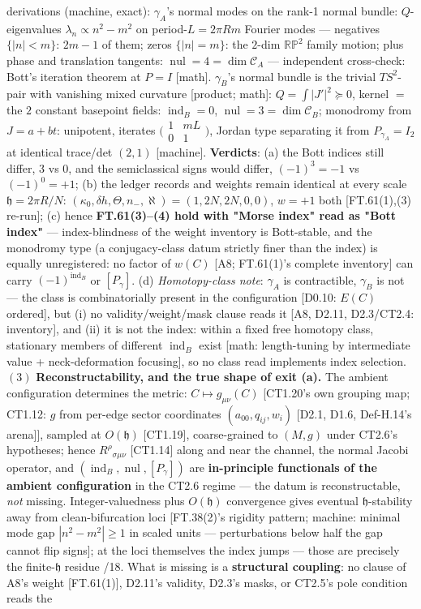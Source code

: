 \begin{theorem}
derivations (machine, exact): $\gamma_A$'s normal modes on the rank-1 normal bundle: $Q$-eigenvalues $\lambda_n\propto n^2-m^2$ on period-$L=2\pi Rm$ Fourier modes — negatives $\{|n|<m\}$: $2m-1$ of them; zeros $\{|n|=m\}$: the $2$-dim $\mathbb{RP}^2$ family motion; plus phase and translation tangents: $\operatorname{nul}=4=\dim\mathcal C_A$ — independent cross-check: Bott's iteration theorem at $P=I$ [math]. $\gamma_B$'s normal bundle is the trivial $TS^2$-pair with vanishing mixed curvature [product; math]: $Q=\int|J'|^2\succeq0$, kernel $=$ the $2$ constant basepoint fields: $\operatorname{ind}_B=0$, $\operatorname{nul}=3=\dim\mathcal C_B$; monodromy from $J=a+bt$: unipotent, iterates $\bigl(\begin{smallmatrix}1&mL\\0&1\end{smallmatrix}\bigr)$, Jordan type separating it from $P_{\gamma_A}=I_2$ at identical trace/det $(2,1)$ [machine]. \textbf{Verdicts}: (a) the Bott indices still differ, $3$ vs $0$, and the semiclassical signs would differ, $(-1)^3=-1$ vs $(-1)^0=+1$; (b) the ledger records and weights remain identical at every scale $\mathfrak h=2\pi R/N$: $(\kappa_0,\delta h,\Theta,n_-,\aleph)=(1,2N,2N,0,0)$, $w=+1$ both [FT.61(1),(3) re-run]; (c) hence \textbf{FT.61(3)–(4) hold with "Morse index" read as "Bott index"} — index-blindness of the weight inventory is Bott-stable, and the monodromy type (a conjugacy-class datum strictly finer than the index) is equally unregistered: no factor of $w(C)$ [A8; FT.61(1)'s complete inventory] can carry $(-1)^{\operatorname{ind}_B}$ or $[P_\gamma]$. (d) \textit{Homotopy-class note}: $\gamma_A$ is contractible, $\gamma_B$ is not — the class is combinatorially present in the configuration [D0.10: $E(C)$ ordered], but (i) no validity/weight/mask clause reads it [A8, D2.11, D2.3/CT2.4: inventory], and (ii) it is not the index: within a fixed free homotopy class, stationary members of different $\operatorname{ind}_B$ exist [math: length-tuning by intermediate value + neck-deformation focusing], so no class read implements index selection. $(3)$ \textbf{Reconstructability, and the true shape of exit (a).} The ambient configuration determines the metric: $C\mapsto g_{\mu\nu}(C)$ [CT1.20's own grouping map; CT1.12: $g$ from per-edge sector coordinates $(a_{00},q_{ij},w_i)$ [D2.1, D1.6, Def-H.14's arena]], sampled at $O(\mathfrak h)$ [CT1.19], coarse-grained to $(M,g)$ under CT2.6's hypotheses; hence $R^\rho{}_{\sigma\mu\nu}$ [CT1.14] along and near the channel, the normal Jacobi operator, and $(\operatorname{ind}_B,\operatorname{nul},[P_\gamma])$ are \textbf{in-principle functionals of the ambient configuration} in the CT2.6 regime — the datum is reconstructable, \textit{not} missing. Integer-valuedness plus $O(\mathfrak h)$ convergence gives eventual $\mathfrak h$-stability away from clean-bifurcation loci [FT.38(2)'s rigidity pattern; machine: minimal mode gap $|n^2-m^2|\ge1$ in scaled units — perturbations below half the gap cannot flip signs]; at the loci themselves the index jumps — those are precisely the finite-$\mathfrak h$ residue /18. What is missing is a \textbf{structural coupling}: no clause of A8's weight [FT.61(1)], D2.11's validity, D2.3's masks, or CT2.5's pole condition reads the 
\end{theorem}
